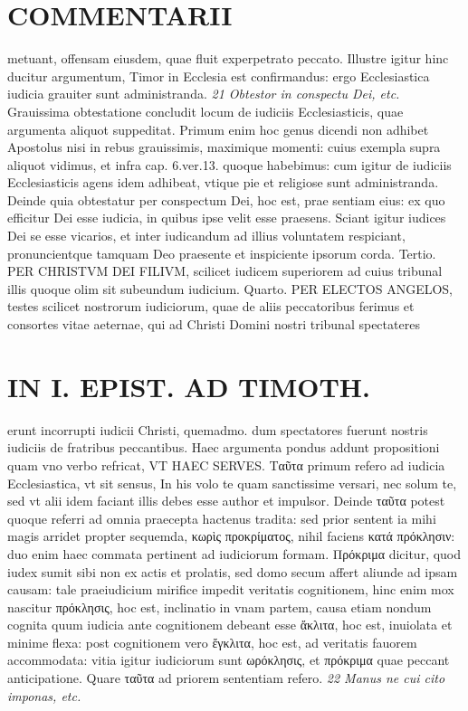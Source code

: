 \documentclass{article}
\begin{document}
\begin{pages}
\section*{COMMENTARII }
\marginpar{[ p.136 ]}\pstart metuant, offensam eiusdem, quae fluit experpetrato peccato. Illustre igitur hinc ducitur argumentum, Timor in Ecclesia est confirmandus: ergo Ecclesiastica iudicia grauiter sunt administranda.  \pend
\textit{21 Obtestor in conspectu Dei, etc. }\pstart Grauissima obtestatione concludit locum de iudiciis Ecclesiasticis, quae argumenta aliquot suppeditat. Primum enim hoc genus dicendi non adhibet Apostolus nisi in rebus grauissimis, maximique momenti: cuius exempla supra aliquot vidimus, et infra cap. 6.ver.13. quoque habebimus: cum igitur de iudiciis Ecclesiasticis agens idem adhibeat, vtique pie et religiose sunt administranda. Deinde quia obtestatur per conspectum Dei, hoc est, prae sentiam eius: ex quo efficitur Dei esse iudicia, in quibus ipse velit esse praesens.  \pend\pstart Sciant igitur iudices Dei se esse vicarios, et inter iudicandum ad illius voluntatem respiciant, pronuncientque tamquam Deo praesente et inspiciente ipsorum corda. Tertio. PER CHRISTVM DEI FILIVM, scilicet iudicem superiorem ad cuius tribunal illis quoque olim sit subeundum iudicium. Quarto. PER ELECTOS ANGELOS, testes scilicet nostrorum iudiciorum, quae de aliis peccatoribus ferimus et consortes vitae aeternae, qui ad Christi Domini nostri tribunal spectateres  \pend
\section*{IN I. EPIST. AD TIMOTH. }
\marginpar{[ p.137 ]}\pstart erunt incorrupti iudicii Christi, quemadmo. dum spectatores fuerunt nostris iudiciis de fratribus peccantibus. Haec argumenta pondus addunt propositioni quam vno verbo refricat, VT HAEC SERVES.  \pend\pstart Ταῦτα primum refero ad iudicia Ecclesiastica, vt sit sensus, In his volo te quam sanctissime versari, nec solum te, sed vt alii idem faciant illis debes esse author et impulsor. Deinde ταῦτα potest quoque referri ad omnia praecepta hactenus tradita: sed prior sentent ia mihi magis arridet propter sequemda,  κωρὶς προκρίματος, nihil faciens κατά πρόκλησιν: duo enim haec commata pertinent ad iudiciorum formam. Πρόκριμα dicitur, quod iudex sumit sibi non ex actis et prolatis, sed domo secum affert aliunde ad ipsam causam: tale praeiudicium mirifice impedit veritatis cognitionem, hinc enim mox nascitur πρόκλησις, hoc est, inclinatio in vnam partem, causa etiam nondum cognita quum iudicia ante cognitionem debeant esse ἄκλιτα, hoc est, inuiolata et minime flexa: post cognitionem vero ἔγκλιτα, hoc est, ad veritatis fauorem accommodata: vitia igitur iudiciorum sunt ωρόκλησις, et πρόκριμα quae peccant anticipatione. Quare ταῦτα ad priorem sententiam refero.  \pend
\textit{22 Manus ne cui cito imponas, etc. }

\end{pages}
\end{document}
